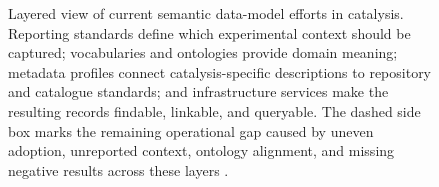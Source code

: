 \begin{figure}[H]
{%
    }
    \caption{Layered view of current semantic data-model efforts in catalysis. Reporting standards define which experimental context should be captured; vocabularies and ontologies provide domain meaning; metadata profiles connect catalysis-specific descriptions to repository and catalogue standards; and infrastructure services make the resulting records findable, linkable, and queryable. The dashed side box marks the remaining operational gap caused by uneven adoption, unreported context, ontology alignment, and missing negative results across these layers \cite{wulf2021unified,nfdi4cat2024whitepaper,stroemert2026chemdcat,behr2024ontologies4cat,salim2026methane}.}
    \label{fig:catalysis-semantic-stack}
\end{figure}
